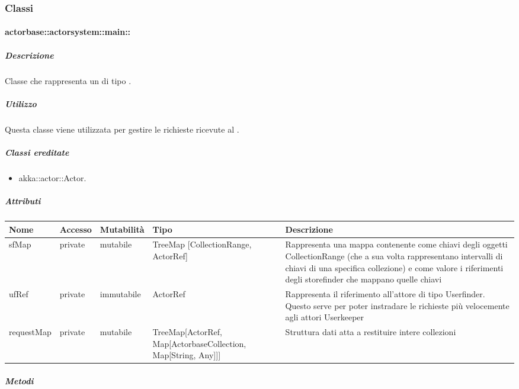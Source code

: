 \documentclass{scalatekids-article}
\begin{document}
\subsubsection{Classi}

\paragraph{actorbase::actorsystem::main::}
\label{sec:actorbase::actorsystem::main::Main}

\subparagraph{Descrizione}
Classe che rappresenta un  di tipo .

\subparagraph{Utilizzo}
Questa classe viene utilizzata per gestire le richieste ricevute al
.

\subparagraph{Classi ereditate}
\begin{itemize}
\item akka::actor::Actor.
\end{itemize}

\subparagraph{Attributi}
\begin{tabular}{| p{3cm} | p{1.5cm} | p{2cm} | p{2cm} | p{8.5cm} |}
  \hline
  Nome & Accesso & Mutabilità & Tipo & Descrizione\\
  \hline
  sfMap & private & mutabile & TreeMap [CollectionRange, ActorRef] & Rappresenta una mappa contenente come chiavi degli oggetti CollectionRange (che a sua volta rappresentano intervalli di chiavi di una specifica collezione) e come valore i riferimenti degli storefinder che mappano quelle chiavi \\
  \hline
  ufRef & private & immutabile & ActorRef & Rappresenta il riferimento all'attore di tipo Userfinder. Questo serve per poter instradare le richieste più velocemente agli attori Userkeeper \\
  \hline
  requestMap & private & mutabile & TreeMap[ActorRef, Map[ActorbaseCollection, Map[String, Any]]] & Struttura dati atta a restituire intere collezioni\\
  \hline
\end{tabular}

\subparagraph{Metodi}
\end{document}
